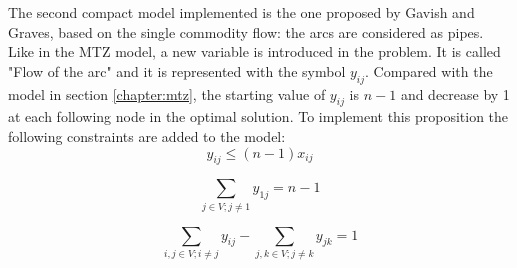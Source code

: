 The second compact model implemented is the one proposed by Gavish and Graves, based on the single commodity flow:  the arcs are considered as pipes.\\
Like in the MTZ model, a new variable is introduced in the problem. It is called "Flow of the arc" and it is represented with the symbol $y_{ij}$. Compared with the model in section \ref{chapter:mtz}, the starting value of $y_{ij}$ is $n-1$ and decrease by 1 at each following node in the optimal solution. 
To implement this proposition the following constraints are added to the model:
\begin{equation}
\label{eqn:linking}
y_{ij}\le (n-1)x_{ij}
\end{equation}

\begin{equation}
\label{eqn:flow_first}
\sum_{j\in V;j\not=1}y_{1j}=n-1
\end{equation}

\begin{equation}
\label{eqn:flows}
\sum_{i, j\in V;i\not=j}y_{ij}-\sum_{j, k \in V;j\not=k}y_{jk}=1
\end{equation}


